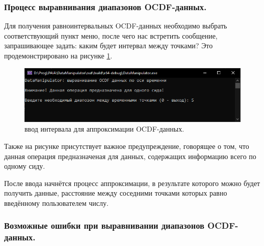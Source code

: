 \subsubsection{ \standartTitleFont
  Процесс выравнивания диапазонов OCDF-данных.
} \label{subsubsec:OCDFRIProc}

{\standartFont

  \par Для получения равноинтервальных OCDF-данных необходимо выбрать соответствующий пункт меню, после чего нас встретить сообщение, запрашивающее задать: каким будет интервал между точками? Это продемонстрировано на рисунке \ref{fig:OCDFappr}.

  \begin{figure}[H]
    \centering
    \includegraphics[width=\textwidth]{images/forDataManipulator/OCDFrightIntervals.png}
    \caption{ввод интервала для аппроксимации OCDF-данных.} 
    \label{fig:OCDFappr}
  \end{figure}

  \par Также на рисунке присутствует важное предупреждение, говорящее о том, что данная операция предназначеная для данных, содержащих информацию всего по одному сиду.

  \par После ввода начнётся процесс аппроксимации, в результате которого можно будет получить данные, расстояние между соседними точками которых равно введённому пользователем числу.  

  \par 
}

\subsubsection{ \standartTitleFont
  Возможные ошибки при выравнивании диапазонов OCDF-данных.
} \label{subsubsec:OCDFRIErr}

